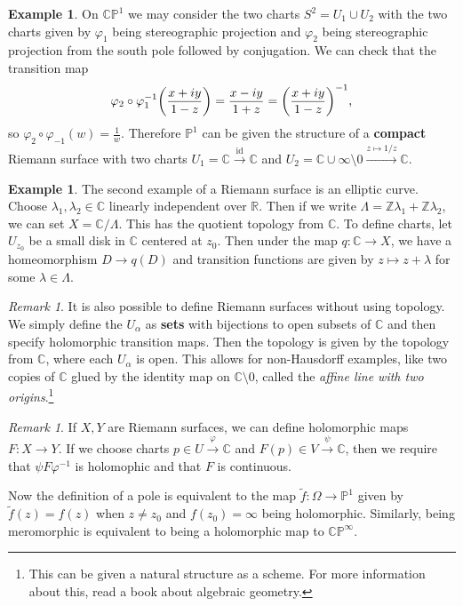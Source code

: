 \documentclass[leqno, openany]{memoir}
\theoremstyle{definition}
\newtheorem{exm}[thm]{Example}
\theoremstyle{remark}
\newtheorem{rmk}[thm]{Remark}
\theoremstyle{plain}
\theoremstyle{definition}
\theoremstyle{remark}
\newcommand{\R}{\mathbb{R}}
\newcommand{\C}{\mathbb{C}}
\newcommand{\Z}{\mathbb{Z}}
\renewcommand{\P}{\mathbb{P}}
\newcommand{\mr}[1]{\mathrm{#1}}
\newcommand{\wt}[1]{\widetilde{#1}}
\begin{document}
\begin{exm}
    On $\C\P^1$ we may consider the two charts $S^2 = U_1 \cup U_2$ with the two charts given by $\varphi_1$ being stereographic projection and $\varphi_2$ being stereographic projection from the south pole followed by conjugation. We can check that the transition map
    \[ \varphi_2 \circ \varphi_1^{-1} \qty(\frac{x+iy}{1-z}) = \frac{x-iy}{1+z} = {\qty(\frac{x+iy}{1-z})}^{-1}, \]
    so $\varphi_2 \circ \varphi_{-1} (w) = \frac{1}{w}$. Therefore $\P^1$ can be given the structure of a \textbf{compact} Riemann surface with two charts $U_1 = \C \xrightarrow{\mr{id}} \C$ and $U_2 = \C \cup \infty \setminus 0 \xrightarrow{z \mapsto 1/z} \C$.
\end{exm}

\begin{exm}
    The second example of a Riemann surface is an elliptic curve. Choose $\lambda_1, \lambda_2 \in \C$ linearly independent over $\R$. Then if we write $\Lambda = \Z \lambda_1 + \Z \lambda_2$, we can set $X = \C/\Lambda$. This has the quotient topology from $\C$. To define charts, let $U_{z_0}$ be a small disk in $\C$ centered at $z_0$. Then under the map $q \colon \C \to X$, we have a homeomorphism $D \to q(D)$ and transition functions are given by $z \mapsto z + \lambda$ for some $\lambda \in \Lambda$.
\end{exm}

\begin{rmk}
    It is also possible to define Riemann surfaces without using topology. We simply define the $U_{\alpha}$ as \textbf{sets} with bijections to open subsets of $\C$ and then specify holomorphic transition maps. Then the topology is given by the topology from $\C$, where each $U_{\alpha}$ is open. This allows for non-Hausdorff examples, like two copies of $\C$ glued by the identity map on $\C \setminus \qty{0}$, called the \textit{affine line with two origins}.\footnote{This can be given a natural structure as a scheme. For more information about this, read a book about algebraic geometry.} 
\end{rmk}

\begin{rmk}
    If $X, Y$ are Riemann surfaces, we can define holomorphic maps $F \colon X \to Y$. If we choose charts $p \in U \xrightarrow{\varphi} \C$ and $F(p) \in V \xrightarrow{\psi} \C$, then we require that $\psi F \varphi^{-1}$ is holomophic and that $F$ is continuous.
\end{rmk}

Now the definition of a pole is equivalent to the map $\wt{f} \colon \Omega \to \P^1$ given by $\wt{f}(z) = f(z)$ when $z \neq z_0$ and $f(z_0) = \infty$ being holomorphic. Similarly, being meromorphic is equivalent to being a holomorphic map to $\C\P^{\infty}$. 
\end{document}
